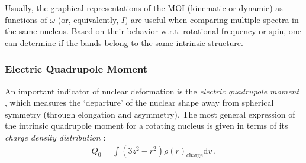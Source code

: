Usually, the graphical representations of the MOI (kinematic or dynamic) as functions of $\omega$ (or, equivalently, $I$) are useful when comparing multiple spectra in the same nucleus. Based on their behavior w.r.t. rotational frequency or spin, one can determine if the bands belong to the same intrinsic structure.

\subsubsection{Electric Quadrupole Moment}
\label{intro-EM-chapter3}

An important indicator of nuclear deformation is the \emph{electric quadrupole moment} \cite{hamamoto2016interplay}, which measures the `departure' of the nuclear shape away from spherical symmetry (through elongation and asymmetry). The most general expression of the intrinsic quadrupole moment for a rotating nucleus is given in terms of its \emph{charge density distribution} \cite{casten2000nuclear}:
\begin{align}
    Q_0=\int(3z^2-r^2)\rho(r)_\text{charge}\text{d}v\ .
    \label{general-quadrupole-moment-Q0-charge}
\end{align}

